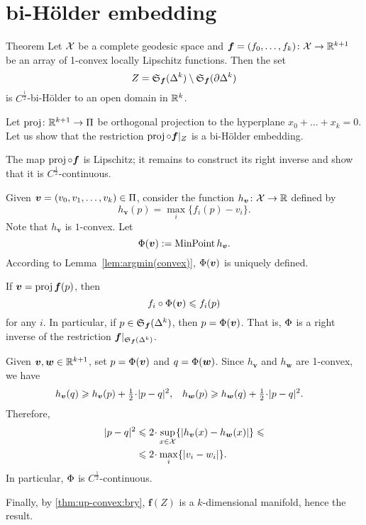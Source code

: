 \section{bi-H\"older embedding}

\begin{thm}{Theorem}\label{thm:bihoelder}
Let $\mathcal{X}$ be a complete geodesic space 
and $\bm{f}\z=(f_0,\z\dots,f_k)\:\spc{X}\to\RR^{k+1}$
be an array of 1-convex locally Lipschitz functions.
Then the set 
\[Z=\mathfrak{S}_{\bm{f}}(\Delta^k)\setminus \mathfrak{S}_{\bm{f}}(\partial \Delta^k)\]
is $C^{\frac12}$-bi-H\"older to an open domain in $\mathbb{R}^k$.
\end{thm}

Let $\operatorname{\rm proj}\nolimits\colon\mathbb{R}^{k+1}\to\Pi$ be orthogonal projection to the hyperplane $x_0+\dots+x_k=0$.
Let us show that the restriction $\operatorname{\rm proj}\nolimits\circ \bm{f}|_Z$ is a bi-H\"older embedding.

The map $\operatorname{\rm proj}\nolimits\circ \bm{f}$ is Lipschitz;
it remains to construct its right inverse and show that it is $C^{\frac12}$-continuous.

Given $\bm{v}=(v_0,v_1,\dots,v_k)\in\Pi$, consider the function 
$h_{\bm{v}}\colon \mathcal{X}\to \mathbb{R}$ defined by
\[h_{\bm{v}}(p)=\max_i\{f_i(p)-v_i\}.\]
Note that $h_{\bm{v}}$ is $1$-convex.
Let 
$$\Phi(\bm{v})\mathrel{:=}\mathop{\rm MinPoint} h_{\bm{v}}.$$
According to Lemma~\ref{lem:argmin(convex)}, $\Phi(\bm{v})$ is uniquely defined.

If $\bm{v}=\operatorname{\rm proj}\nolimits \bm{f}(p)$, then 
\[f_i\circ \Phi(\bm{v})\leqslant f_i(p)\]
for any $i$.
In particular, if $p\in \mathfrak{S}_{\bm{f}}(\Delta^k)$, then  $p=\Phi(\bm{v})$.
That is, $\Phi$ is a right inverse of the restriction $\bm{f}|_{\mathfrak{S}_{\bm{f}}(\Delta^k)}$.

Given $\bm{v},\bm{w}\in\mathbb{R}^{k+1}$,
set $p=\Phi (\bm{v})$ and $q=\Phi (\bm{w})$.
Since $h_{\bm{v}}$ and $h_{\bm{w}}$ are 1-convex, we have
\begin{align*}
h_{\bm{v}}(q)
&\ge 
h_{\bm{v}}(p)+\tfrac{1}{2}\cdot\dist[2]{p}{q}{},
&
h_{\bm{w}}(p)
&\ge 
h_{\bm{w}}(q)+\tfrac{1}{2}\cdot\dist[2]{p}{q}{}.
\end{align*}
Therefore,
\begin{align*}
\dist[2]{p}{q}{}
&\le 
2\cdot\sup_{x\in\spc{X}}\{ |h_{\bm{v}}(x)-h_{\bm{w}}(x)| \}
\le
\\
&\le 
2\cdot\max_{i}\{|v_i-w_i|\}.
\end{align*}
In particular,
$\Phi$ is $C^{\frac{1}{2}}$-continuous.

Finally, by \ref{thm:up-convex:bry}, $\bm{f}(Z)$ is a $k$-dimensional manifold, hence the result.
\qeds

